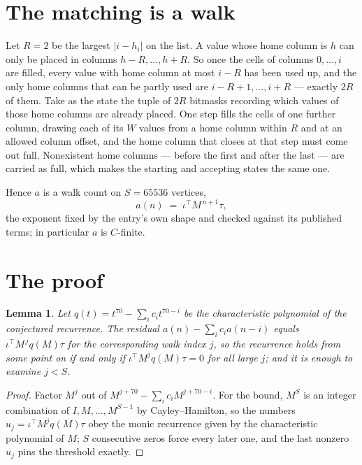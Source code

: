 \documentclass[11pt,a4paper]{article}
\theoremstyle{plain}
\newtheorem{lemma}[theorem]{Lemma}
\theoremstyle{definition}
\begin{document}
\section{The matching is a walk}

Let $R=2$ be the largest $|i-h_i|$ on the list. A value whose home column is $h$ can only be
placed in columns $h-R,\dots,h+R$. So once the cells of columns $0,\dots,i$ are filled, every
value with home column at most $i-R$ has been used up, and the only home columns that can be
partly used are $i-R+1,\dots,i+R$ --- exactly $2R$ of them. Take as the state the tuple of
$2R$ bitmasks recording which values of those home columns are already placed. One step fills
the cells of one further column, drawing each of its $W$ values from a home column within $R$
and at an allowed column offset, and the home column that closes at that step must come out
full. Nonexistent home columns --- before the first and after the last --- are carried as
full, which makes the starting and accepting states the same one.

Hence $a$ is a walk count on $S=65536$ vertices,
\[
a(n)\;=\;\iota^{\!\top}M^{\,n+1}\tau ,
\]
the exponent fixed by the entry's own shape and checked against its published terms; in
particular $a$ is $C$-finite.

\section{The proof}

\begin{lemma}\label{lem:crit}
Let $q(t)=t^{70}-\sum_i c_it^{70-i}$ be the characteristic polynomial of the
conjectured recurrence. The residual $a(n)-\sum_ic_ia(n-i)$ equals
$\iota^{\!\top}M^{\,j}q(M)\tau$ for the corresponding walk index $j$, so the recurrence
holds from some point on if and only if $\iota^{\!\top}M^{j}q(M)\tau=0$ for all large $j$;
and it is enough to examine $j<S$.
\end{lemma}

\begin{proof}
Factor $M^{j}$ out of $M^{j+70}-\sum_ic_iM^{j+70-i}$. For the bound, $M^{S}$
is an integer combination of $I,M,\dots,M^{S-1}$ by Cayley--Hamilton, so the numbers
$u_j=\iota^{\!\top}M^{j}q(M)\tau$ obey the monic recurrence given by the characteristic
polynomial of $M$; $S$ consecutive zeros force every later one, and the last nonzero $u_j$
pins the threshold exactly.
\end{proof}
\end{document}
